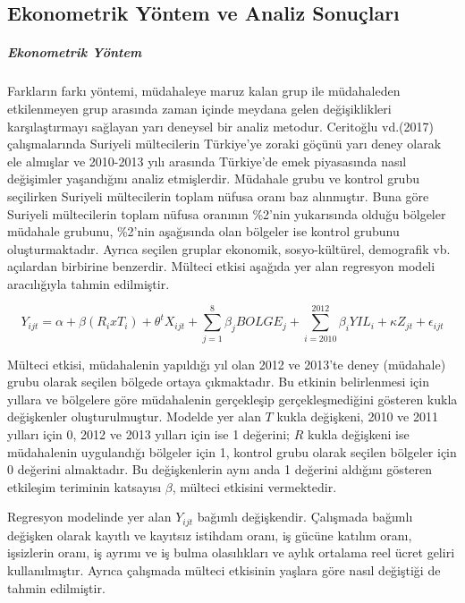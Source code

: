 \documentclass{article}
\begin{document}
    \newpage

    \subsection*{Ekonometrik Yöntem ve Analiz Sonuçları}
    \setlength{\parindent}{0em}
    \setlength{\parskip}{0.3em}

    \subparagraph{Ekonometrik Yöntem} 
    \begin{justify}
    \setlength{\parindent}{0em}
    Farkların farkı yöntemi, müdahaleye maruz kalan grup ile müdahaleden etkilenmeyen grup 
    arasında zaman içinde meydana gelen değişiklikleri karşılaştırmayı sağlayan yarı deneysel bir 
    analiz metodur. Ceritoğlu vd.(2017) çalışmalarında Suriyeli mültecilerin Türkiye'ye zoraki 
    göçünü yarı deney olarak ele almışlar ve 2010-2013 yılı arasında Türkiye'de emek piyasasında
    nasıl değişimler yaşandığını analiz etmişlerdir. Müdahale grubu ve kontrol grubu seçilirken
    Suriyeli mültecilerin toplam nüfusa oranı baz alınmıştır. Buna göre Suriyeli mültecilerin 
    toplam nüfusa oranının \%2'nin yukarısında olduğu bölgeler müdahale grubunu, \%2'nin aşağısında
    olan bölgeler ise kontrol grubunu oluşturmaktadır. Ayrıca seçilen gruplar ekonomik, sosyo-kültürel,
    demografik vb. açılardan birbirine benzerdir. Mülteci etkisi aşağıda yer alan regresyon modeli 
    aracılığıyla tahmin edilmiştir.

    \[ Y_{ijt} = \alpha + \beta (R_i x T_i) + \theta^t X_{ijt} +
    \sum_{j=1}^{8}\beta_j BOLGE_j + \sum_{i=2010}^{2012}\beta_i YIL_{i} + \kappa Z_{jt} + \epsilon_{ijt}  \]
    
    Mülteci etkisi, müdahalenin yapıldığı yıl olan 2012 ve 2013'te deney (müdahale) grubu olarak seçilen 
    bölgede ortaya çıkmaktadır.
    Bu etkinin belirlenmesi için yıllara ve bölgelere göre müdahalenin gerçekleşip gerçekleşmediğini 
    gösteren kukla değişkenler oluşturulmuştur. Modelde yer alan $T$ kukla değişkeni, 2010 ve 2011
    yılları için 0, 2012 ve 2013 yılları için ise 1 değerini; $R$ kukla değişkeni ise 
    müdahalenin uygulandığı bölgeler için 1, kontrol grubu olarak seçilen bölgeler için 0 değerini
    almaktadır. Bu değişkenlerin aynı anda 1 değerini aldığını gösteren etkileşim teriminin katsayısı 
    $\beta$, mülteci etkisini vermektedir.
    
    Regresyon modelinde yer alan $Y_{ijt}$ bağımlı değişkendir. Çalışmada bağımlı değişken olarak
    kayıtlı ve kayıtsız istihdam oranı, iş gücüne katılım oranı, işsizlerin oranı, iş ayrımı ve iş 
    bulma olasılıkları ve aylık ortalama reel ücret geliri kullanılmıştır. Ayrıca çalışmada mülteci 
    etkisinin yaşlara göre nasıl değiştiği de tahmin edilmiştir.
    

\end{justify}
\end{document}
